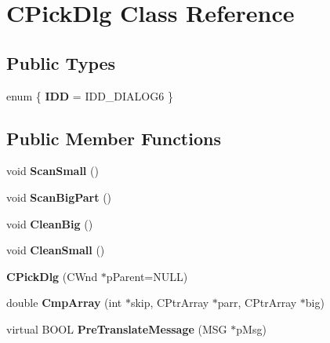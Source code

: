 \hypertarget{class_c_pick_dlg}{\section{C\-Pick\-Dlg Class Reference}
\label{class_c_pick_dlg}
}
\subsection*{Public Types}
\begin{DoxyCompactItemize}
\item 
enum \{ {\bfseries I\-D\-D} =  I\-D\-D\-\_\-\-D\-I\-A\-L\-O\-G6
 \}
\end{DoxyCompactItemize}
\subsection*{Public Member Functions}
\begin{DoxyCompactItemize}
\item 
\hypertarget{class_c_pick_dlg_a4d0f6ebeaf6676e22a9c2a0bfb4cd1fc}{void {\bfseries Scan\-Small} ()}\label{class_c_pick_dlg_a4d0f6ebeaf6676e22a9c2a0bfb4cd1fc}

\item 
\hypertarget{class_c_pick_dlg_ac6ac9bd6b227f8f09ca65cfcfc645eca}{void {\bfseries Scan\-Big\-Part} ()}\label{class_c_pick_dlg_ac6ac9bd6b227f8f09ca65cfcfc645eca}

\item 
\hypertarget{class_c_pick_dlg_a649696251cfa7c8347f194bfcc207c93}{void {\bfseries Clean\-Big} ()}\label{class_c_pick_dlg_a649696251cfa7c8347f194bfcc207c93}

\item 
\hypertarget{class_c_pick_dlg_a2aa746b73522d62621454039840b17a6}{void {\bfseries Clean\-Small} ()}\label{class_c_pick_dlg_a2aa746b73522d62621454039840b17a6}

\item 
\hypertarget{class_c_pick_dlg_ae2200cda80db0098ce9855c8f2928819}{{\bfseries C\-Pick\-Dlg} (C\-Wnd $\ast$p\-Parent=N\-U\-L\-L)}\label{class_c_pick_dlg_ae2200cda80db0098ce9855c8f2928819}

\item 
\hypertarget{class_c_pick_dlg_a2f296842501737863eff6eeb50979f1a}{double {\bfseries Cmp\-Array} (int $\ast$skip, C\-Ptr\-Array $\ast$parr, C\-Ptr\-Array $\ast$big)}\label{class_c_pick_dlg_a2f296842501737863eff6eeb50979f1a}

\item 
\hypertarget{class_c_pick_dlg_a19b793176947e100e86e030b528a6434}{virtual B\-O\-O\-L {\bfseries Pre\-Translate\-Message} (M\-S\-G $\ast$p\-Msg)}\label{class_c_pick_dlg_a19b793176947e100e86e030b528a6434}

\end{DoxyCompactItemize}
